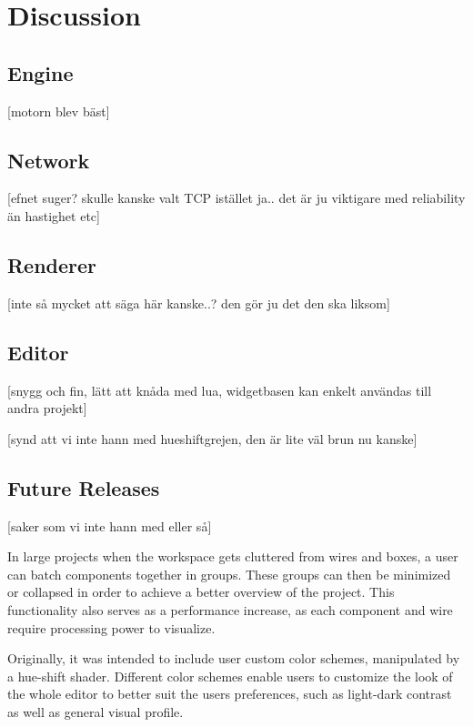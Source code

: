 \chapter{Discussion}

\section{Engine}

[motorn blev bäst]

\section{Network}

[efnet suger? skulle kanske valt TCP istället ja.. det är ju viktigare med reliability än hastighet etc]

\section{Renderer}

[inte så mycket att säga här kanske..? den gör ju det den ska liksom]

\section{Editor}

[snygg och fin, lätt att knåda med lua, widgetbasen kan enkelt användas till andra projekt]

[synd att vi inte hann med hueshiftgrejen, den är lite väl brun nu kanske]

\section{Future Releases}
[saker som vi inte hann med eller så]

In large projects when the workspace gets cluttered from wires and boxes, a user can batch components together in groups. These groups can then be minimized or collapsed in order to achieve a better overview of the project. This functionality also serves as a performance increase, as each component and wire require processing power to visualize. 

Originally, it was intended to include user custom color schemes, manipulated by a hue-shift shader. Different color schemes enable users to customize the look of the whole editor to better suit the users preferences, such as light-dark contrast as well as general visual profile.

